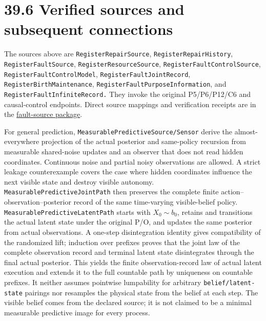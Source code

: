 \documentclass[
  english,
  11pt,
  oneside]{book}
\begin{document}
\section{39.6 Verified sources and subsequent connections}\label{verified-sources-and-subsequent-connections}

The sources above are \nolinkurl{RegisterRepairSource}, \nolinkurl{RegisterRepairHistory}, \nolinkurl{RegisterFaultSource}, \nolinkurl{RegisterResourceSource}, \nolinkurl{RegisterFaultControlSource}, \nolinkurl{RegisterFaultControlModel}, \nolinkurl{RegisterFaultJointRecord}, \nolinkurl{RegisterBirthMaintenance}, \nolinkurl{RegisterFaultPurposeInformation}, and \nolinkurl{RegisterFaultInfiniteRecord.} They invoke the original P5/P6/P12/C6 and causal-control endpoints. Direct source mappings and verification receipts are in the \href{../formalization/ueot-core/docs/compression/theory_completion/unified_closure/register_fault_resources_v1/RESULTS_AND_OPEN_OBLIGATIONS.md}{fault-source package}.

For general prediction, \nolinkurl{MeasurablePredictiveSource/Sensor} derive the almost-everywhere projection of the actual posterior and same-policy recursion from measurable shared-noise updates and an observer that does not read hidden coordinates. Continuous noise and partial noisy observations are allowed. A strict leakage counterexample covers the case where hidden coordinates influence the next visible state and destroy visible autonomy. \nolinkurl{MeasurablePredictiveJointPath} then preserves the complete finite action--observation--posterior record of the same time-varying visible-belief policy. \nolinkurl{MeasurablePredictiveLatentPath} starts with \(X_0\sim b_0\), retains and transitions the actual latent state under the original P/O, and updates the same posterior from actual observations. A one-step disintegration identity gives compatibility of the randomized lift; induction over prefixes proves that the joint law of the complete observation record and terminal latent state disintegrates through the final actual posterior. This yields the finite observation-record law of actual latent execution and extends it to the full countable path by uniqueness on countable prefixes. It neither assumes pointwise lumpability for arbitrary \nolinkurl{belief/latent-state} pairings nor resamples the physical state from the belief at each step. The visible belief comes from the declared source; it is not claimed to be a minimal measurable predictive image for every process.
\end{document}
